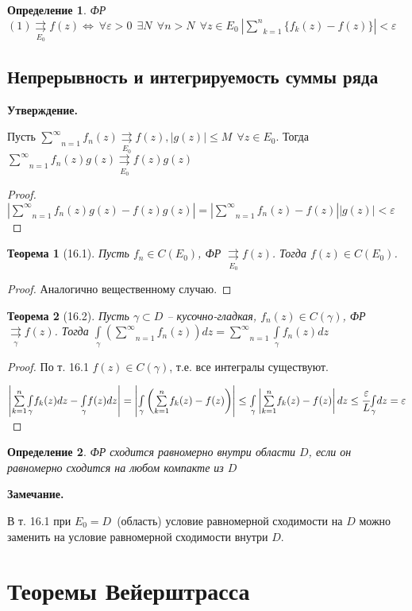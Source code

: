 \documentclass[final]{report}
\newcommand{\rra}{\rightrightarrows}
\newcommand{\rrae}[1]{\underset{#1}{\rightrightarrows}}
\newcommand{\mint}[2]{\underset{#1}{\overset{#2}{\int}}}
\newcommand{\msum}[2]{\underset{#1}{\overset{#2}{\sum}}}
\newcommand{\LRA}{\Leftrightarrow}
\newcommand{\g}{\gamma}
\newcommand{\e}{\varepsilon}
\newcommand{\E}{\ \exists}
\newcommand{\F}{\ \forall}
\newcommand{\opr}[1]{\begin{opred}#1\end{opred}}
\newtheorem*{theor}{Теорема}
\newtheorem*{opred}{Определение}
\theoremstyle{remark}
\begin{document}
\opr{ФР $(1)\underset{E_0}{\rra}f(z)\LRA \F \e>0\ \E N\ \F n>N\ \F z\in E_0\ \left|\msum{k=1}{n}\{f_k(z)-f(z)\}\right|<\e$}

\subsection{Непрерывность и интегрируемость суммы ряда}

{\bfseries Утверждение.}

Пусть $\msum{n=1}{\infty}f_n(z)\rrae{E_0}f(z), |g(z)|\leq M\ \F z\in E_0$. Тогда $\msum{n=1}{\infty}f_n(z)g(z)\rrae{E_0}f(z)g(z)$
\begin{proof}
$|\msum{n=1}{\infty}f_n(z)g(z)-f(z)g(z)|=|\msum{n=1}{\infty}f_n(z)-f(z)||g(z)|<\e$
\end{proof}

\begin{theor}[16.1]
Пусть $f_n\in C(E_0)$, ФР $\rrae{E_0}f(z)$. Тогда $f(z)\in C(E_0)$.
\end{theor}
\begin{proof}
Аналогично вещественному случаю.
\end{proof}

\begin{theor}[16.2]
Пусть $\g\subset D$ -- кусочно-гладкая, $f_n(z)\in C(\g)$, ФР$\rrae{\g}f(z)$. Тогда $\mint{\g}{}\left(\msum{n=1}{\infty}f_n(z)\right)dz=\msum{n=1}{\infty}\mint{\g}{}f_n(z)dz$
\end{theor}
\begin{proof}
По т. 16.1 $f(z)\in C(\g)$, т.е. все интегралы существуют.

$\left|\msum{k=1}{n}\mint{\g}{}f_k(z)dz-\mint{\g}{}f(z)dz\right|=\left|\mint{\g}{}\left(\msum{k=1}{n}f_k(z)-f(z)\right)\right|\leq\mint{\g}{}\left|\msum{k=1}{n}f_k(z)-f(z)\right|dz\leq\cfrac \e L\mint{\g}{}dz=\e$
\end{proof}

\opr{ФР сходится равномерно внутри области $D$, если он равномерно сходится на любом компакте из $D$}

{\bfseries Замечание.}

В т. 16.1 при $E_0=D$~(область) условие равномерной сходимости на $D$ можно заменить на условие равномерной сходимости внутри $D$.

\newpage

\section{Теоремы Вейерштрасса}
\end{document}

